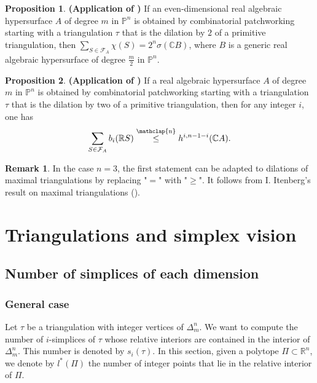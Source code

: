 \documentclass[12pt]{article}
\newcommand\customleq{\stackrel{\mathclap{\normalfont\scriptsize\mbox{n}}}{\leq}}
\newcommand{\R}{\mathbb{R}}
\newcommand{\C}{\mathbb{C}}
\renewcommand{\P}{\mathbb{P}}
\theoremstyle{definition}
\newtheorem{prop}{Proposition}[section]
\newtheorem{rmk}{Remark}[section]
\begin{document}
\begin{prop}
    \textbf{(Application of \cite{bertrandthese})} If an even-dimensional real algebraic hypersurface $A$ of degree $m$ in $\P^n$ is obtained by combinatorial patchworking starting with a triangulation $\tau$ that is the dilation by $2$ of a primitive triangulation, then $\sum_{S \in \mathcal{F}_A} \chi(S) = 2^n \sigma(\C B)$, where $B$ is a generic real algebraic hypersurface of degree $\frac{m}{2}$ in $\P^n$.
\end{prop}
\begin{prop}
    \textbf{(Application of \cite{renaudineau})} If a real algebraic hypersurface $A$ of degree $m$ in $\P^n$ is obtained by combinatorial patchworking starting with a triangulation $\tau$ that is the dilation by two of a primitive triangulation, then for any integer $i$, one has
    \begin{equation*}
        \sum_{S \in \mathcal{F}_A} b_i(\R S) \customleq h^{i,n-1-i}(\C A).
    \end{equation*}
\end{prop}

\begin{rmk}
    In the case $n=3$, the first statement can be adapted to dilations of maximal triangulations by replacing "$=$" with "$\geq$". It follows from I. Itenberg's result on maximal triangulations (\cite{tsurf}).
\end{rmk}

\section{Triangulations and simplex vision}

\label{section_triangulations}

\subsection{Number of simplices of each dimension}

\subsubsection{General case}

\begin{sloppypar}
    Let $\tau$ be a triangulation with integer vertices of $\Delta_m^n$. We want to compute the number of $i$-simplices of $\tau$ whose relative interiors are contained in the interior of $\Delta_m^n$. This number is denoted by $s_i(\tau)$. In this section, given a polytope $\Pi \subset \R^n$, we denote by $l^*(\Pi)$ the number of integer points that lie in the relative interior of $\Pi$.
\end{sloppypar}
\end{document}
